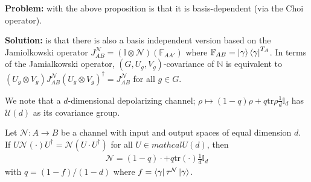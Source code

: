 \documentclass[../../note.tex]{subfiles}
\begin{document}
\noindent \textbf{Problem:} with the above proposition is that it is basis-dependent (via the Choi operator). 

\noindent\textbf{Solution:} is that there is also a basis independent version based on the Jamiolkowski operator $J^{\mathcal{N}}_{AB} = (\mathbb{I}\otimes \mathcal{N})(\mathbb{F}_{AA'})$ where $\mathbb{F}_{AB} =\ket{\gamma}\bra{\gamma}^{T_A}$. In terms of the Jamialkowski operator, $(G,U_g,V_g)$-covariance of $\mathbb{N}$ is equivalent to $(U_g \otimes V_g) J^{\mathcal{N}}_{AB} (U_g \otimes V_g)^{\dagger} = J_{AB}^{\mathcal{N}}$ for all $g \in G$.

We note that a $d$-dimensional depolarizing channel; $\rho \mapsto (1-q)\rho + q \text{tr}\rho \frac{1}{d} \mathbb{I}_d$ has $\mathcal{U}(d)$ as its covariance group. 

\begin{proposition}
Let $\mathcal{N}: A\rightarrow B$ be a channel with input and output spaces of equal dimension $d$. If $U \mathcal{N}(\cdot) U^{\dagger}=\mathcal{N}(U \cdot U^{\dagger})$ for all $U\in mathcal{U}(d)$, then 
\begin{align}
    \mathcal{N}=(1-q) \cdot + q \text{tr}(\cdot) \frac{1}{d} \mathbb{I}_d
\end{align}
with $q=(1-f)/(1-d)$ where $f=\bra{\gamma}\tau^{\mathcal{N}}\ket{\gamma}$.
\end{proposition}
%
\end{document}
